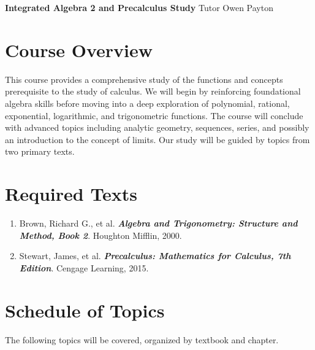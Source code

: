 \documentclass[11pt, letterpaper]{article}
\begin{document}
\vspace*{0.5cm} %
\noindent
{\Large \textbf{Integrated Algebra 2 and Precalculus Study}} \hfill {\large Tutor Owen Payton}

\section*{Course Overview}
This course provides a comprehensive study of the functions and concepts prerequisite to the study of calculus. We will begin by reinforcing foundational algebra skills before moving into a deep exploration of polynomial, rational, exponential, logarithmic, and trigonometric functions. The course will conclude with advanced topics including analytic geometry, sequences, series, and possibly an introduction to the concept of limits. Our study will be guided by topics from two primary texts.

\section*{Required Texts}
\begin{enumerate}
    \item Brown, Richard G., et al. \textbf{\textit{Algebra and Trigonometry: Structure and Method, Book 2}}. Houghton Mifflin, 2000.
    \item Stewart, James, et al. \textbf{\textit{Precalculus: Mathematics for Calculus, 7th Edition}}. Cengage Learning, 2015.
\end{enumerate}

\section*{Schedule of Topics}
The following topics will be covered, organized by textbook and chapter.

\end{document}
